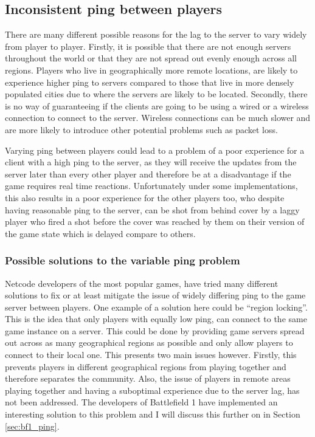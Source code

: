 \subsection{Inconsistent ping between players}
There are many different possible reasons for the lag to the server to vary widely from player to player. Firstly, it is possible that there are not enough servers throughout the world or that they are not spread out evenly enough across all regions. Players who live in geographically more remote locations, are likely to experience higher ping to servers compared to those that live in more densely populated cities due to where the servers are likely to be located. Secondly, there is no way of guaranteeing if the clients are going to be using a wired or a wireless connection to connect to the server. Wireless connections can be much slower and are more likely to introduce other potential problems such as packet loss.

Varying ping between players could lead to a problem of a poor experience for a client with a high ping to the server, as they will receive the updates from the server later than every other player and therefore be at a disadvantage if the game requires real time reactions. Unfortunately under some implementations, this also results in a poor experience for the other players too, who despite having reasonable ping to the server, can be shot from behind cover by a laggy player who fired a shot before the cover was reached by them on their version of the game state which is delayed compare to others.


\subsubsection{Possible solutions to the variable ping problem}
Netcode developers of the most popular games, have tried many different solutions to fix or at least mitigate the issue of widely differing ping to the game server between players. One example of a solution here could be ``region locking''. This is the idea that only players with equally low ping, can connect to the same game instance on a server. This could be done by providing game servers spread out across as many geographical regions as possible and only allow players to connect to their local one. This presents two main issues however. Firstly, this prevents players in different geographical regions from playing together and therefore separates the community. Also, the issue of players in remote areas playing together and having a suboptimal experience due to the server lag, has not been addressed. The developers of Battlefield 1 have implemented an interesting solution to this problem and I will discuss this further on in Section \ref{sec:bf1_ping}.


